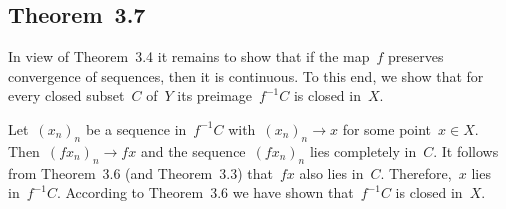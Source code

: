 \subsection{Theorem~3.7}

In view of Theorem~3.4 it remains to show that if the map~$f$ preserves convergence of sequences, then it is continuous.
To this end, we show that for every closed subset~$C$ of~$Y$ its preimage~$f^{-1} C$ is closed in~$X$.

Let~$(x_n)_n$ be a sequence in~$f^{-1} C$ with~$(x_n)_n \to x$ for some point~$x ∈ X$.
Then~$(f x_n)_n \to f x$ and the sequence~$(f x_n)_n$ lies completely in~$C$.
It follows from Theorem~3.6 (and Theorem~3.3) that~$f x$ also lies in~$C$.
Therefore,~$x$ lies in~$f^{-1} C$.
According to Theorem~3.6 we have shown that~$f^{-1} C$ is closed in~$X$.
